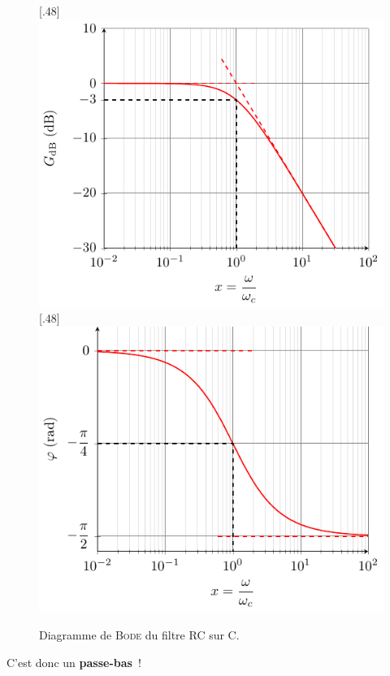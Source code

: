 \documentclass[../../main/main.tex]{subfiles}
\begin{document}
\begin{figure}[htbp!]
	\centering
	[.48\linewidth]
	{\includegraphics[width=\linewidth]{RCC_bode-gain}}
	[.48\linewidth]
	{\includegraphics[width=\linewidth]{RCC_bode-phase}}
	\caption{Diagramme de \textsc{Bode} du filtre RC sur C.}
	\label{fig:rccbode_first}
\end{figure}
C'est donc un \textbf{passe-bas}~!
\end{document}
